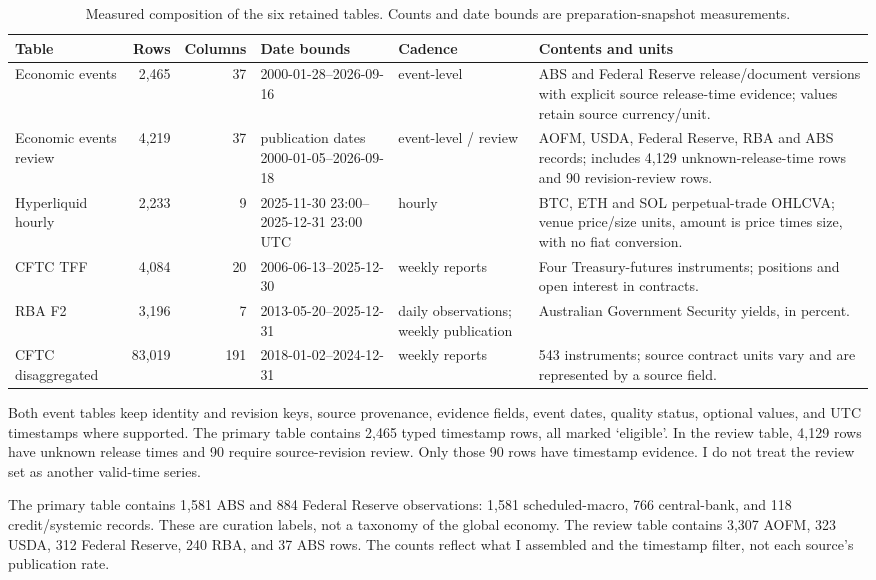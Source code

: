 \documentclass[10pt]{article}
\begin{document}
\begin{table}[t]
\centering\small
\caption{Measured composition of the six retained tables. Counts and date bounds are preparation-snapshot measurements.}
\label{tab:composition}
\begin{tabularx}{\textwidth}{@{}p{2.5cm} r r p{3.0cm} p{2.0cm} Y@{}}
\toprule
Table & Rows & Columns & Date bounds & Cadence & Contents and units \\
\midrule
Economic events & 2,465 & 37 & 2000-01-28--2026-09-16 & event-level & ABS and Federal Reserve release/document versions with explicit source release-time evidence; values retain source currency/unit. \\
Economic events review & 4,219 & 37 & publication dates 2000-01-05--2026-09-18 & event-level / review & AOFM, USDA, Federal Reserve, RBA and ABS records; includes 4,129 unknown-release-time rows and 90 revision-review rows. \\
Hyperliquid hourly & 2,233 & 9 & 2025-11-30 23:00--2025-12-31 23:00 UTC & hourly & BTC, ETH and SOL perpetual-trade OHLCVA; venue price/size units, amount is price times size, with no fiat conversion. \\
CFTC TFF & 4,084 & 20 & 2006-06-13--2025-12-30 & weekly reports & Four Treasury-futures instruments; positions and open interest in contracts. \\
RBA F2 & 3,196 & 7 & 2013-05-20--2025-12-31 & daily observations; weekly publication & Australian Government Security yields, in percent. \\
CFTC disaggregated & 83,019 & 191 & 2018-01-02--2024-12-31 & weekly reports & 543 instruments; source contract units vary and are represented by a source field. \\
\bottomrule
\end{tabularx}
\end{table}

Both event tables keep identity and revision keys, source provenance, evidence fields, event dates, quality status, optional values, and UTC timestamps where supported. The primary table contains 2,465 typed timestamp rows, all marked `eligible'. In the review table, 4,129 rows have unknown release times and 90 require source-revision review. Only those 90 rows have timestamp evidence. I do not treat the review set as another valid-time series.

The primary table contains 1,581 ABS and 884 Federal Reserve observations: 1,581 scheduled-macro, 766 central-bank, and 118 credit/systemic records. These are curation labels, not a taxonomy of the global economy. The review table contains 3,307 AOFM, 323 USDA, 312 Federal Reserve, 240 RBA, and 37 ABS rows. The counts reflect what I assembled and the timestamp filter, not each source's publication rate.
\end{document}
